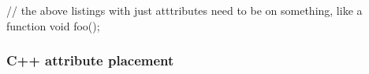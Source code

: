 \begin{emcppshiddenlisting}[emcppsbatch={e1,e2,e3,e4}]
// the above listings with just atttributes need to be on something, like a function
void foo();
\end{emcppshiddenlisting}


\subsubsection[C++ attribute placement]{C++ attribute placement}\label{c++-attribute-placement}

%
%
%
%
